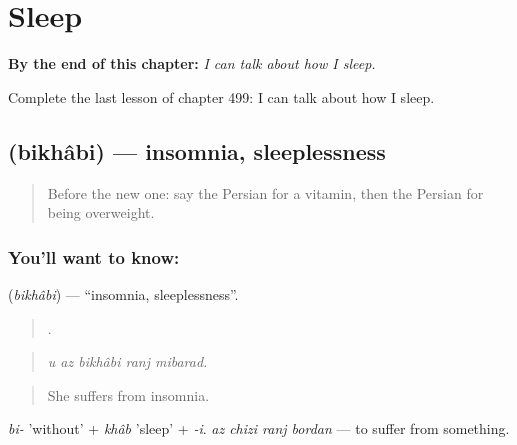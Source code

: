 
\chapter{Sleep}
\label{ch:fa-sleep}

\begin{chapteropening}
\textbf{By the end of this chapter:} \emph{I can talk about how I sleep.}

Complete the last lesson of chapter 499: I can talk about how I sleep.
\end{chapteropening}

\section[\texorpdfstring{\fa{بیخوابی} (bikhâbi)}{بیخوابی (bikhâbi)}]{ (bikhâbi) — insomnia, sleeplessness}

\label{lesson:FA-C499-bikhabi}



\begin{quote}
Before the new one: say the Persian for a vitamin, then the Persian for being overweight.
\end{quote}

\subsection*{You'll want to know: }
\textbf{} (\emph{bikhâbi}) — \textquotedblleft{}insomnia, sleeplessness\textquotedblright{}.

\begin{quote}
    .
\end{quote}

\begin{quote}
\emph{u az bikhâbi ranj mibarad.}
\end{quote}

\begin{quote}
She suffers from insomnia.
\end{quote}

\emph{bi-} 'without' + \emph{khâb} 'sleep' + \emph{-i}. \emph{az chizi ranj bordan} — to suffer from something.

